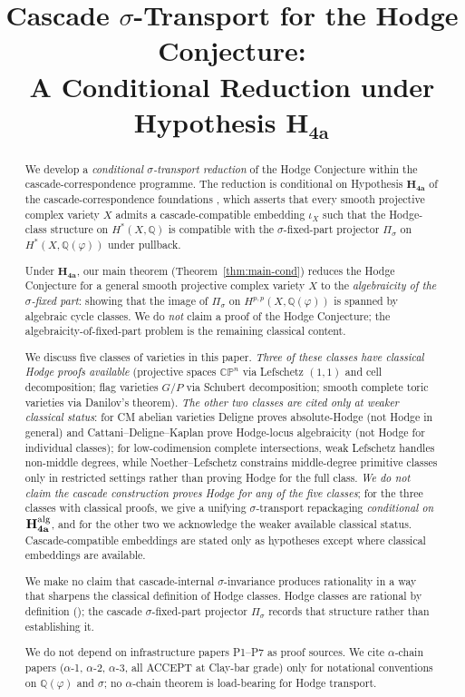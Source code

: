 \documentclass[11pt, a4paper]{amsart}
\title{Cascade $\sigma$-Transport for the Hodge Conjecture:\\
  A Conditional Reduction under Hypothesis $\mathbf{H_{4a}}$}
\author{}
\date{}
\theoremstyle{definition}
\newcommand{\Q}{\mathbb{Q}}
\newcommand{\CP}{\mathbb{CP}}
\begin{document}
\maketitle

\begin{abstract}
We develop a \emph{conditional $\sigma$-transport reduction} of the
Hodge Conjecture within the cascade-correspondence programme. The
reduction is conditional on Hypothesis $\mathbf{H_{4a}}$ of the
cascade-correspondence foundations
\cite[\S H${}_{4a}$]{CascadeFoundations}, which asserts that every
smooth projective complex variety $X$ admits a cascade-compatible
embedding $\iota_X$ such that the Hodge-class structure on
$H^*(X, \Q)$ is compatible with the $\sigma$-fixed-part projector
$\Pi_\sigma$ on $H^*(X, \Q(\varphi))$ under pullback.

Under $\mathbf{H_{4a}}$, our main theorem
(Theorem~\ref{thm:main-cond}) reduces the Hodge Conjecture for a
general smooth projective complex variety $X$ to the
\emph{algebraicity of the $\sigma$-fixed part}: showing that the
image of $\Pi_\sigma$ on $H^{p,p}(X, \Q(\varphi))$ is spanned by
algebraic cycle classes. We do \emph{not} claim a proof of the
Hodge Conjecture; the algebraicity-of-fixed-part problem is the
remaining classical content.

We discuss five classes of varieties in this paper. \emph{Three
of these classes have classical Hodge proofs available}
(projective spaces $\CP^n$ via Lefschetz $(1,1)$ and cell
decomposition; flag varieties $G/P$ via Schubert decomposition;
smooth complete toric varieties via Danilov's theorem). \emph{The
other two classes are cited only at weaker classical status}: for
CM abelian varieties Deligne proves absolute-Hodge (not Hodge in
general) and Cattani--Deligne--Kaplan prove Hodge-locus
algebraicity (not Hodge for individual classes); for low-codimension
complete intersections, weak Lefschetz handles non-middle degrees,
while Noether--Lefschetz constrains middle-degree primitive classes
only in restricted settings rather than proving Hodge for the full
class. \emph{We do not claim the cascade construction proves Hodge
for any of the five classes}; for the three classes with classical
proofs, we give a unifying $\sigma$-transport repackaging
\emph{conditional on $\mathbf{H_{4a}^{\rm alg}}$}, and for the
other two we acknowledge the weaker available classical status.
Cascade-compatible embeddings are stated only as hypotheses except
where classical embeddings are available.

We make no claim that cascade-internal $\sigma$-invariance produces
rationality in a way that sharpens the classical definition of
Hodge classes. Hodge classes are rational by definition
(\cite[Ch.~11]{Voisin2002}); the cascade $\sigma$-fixed-part
projector $\Pi_\sigma$ records that structure rather than
establishing it.

We do not depend on infrastructure papers P1--P7 as proof sources.
We cite $\alpha$-chain papers ($\alpha$-1, $\alpha$-2, $\alpha$-3,
all ACCEPT at Clay-bar grade) only for notational conventions on
$\Q(\varphi)$ and $\sigma$; no $\alpha$-chain theorem is
load-bearing for Hodge transport.
\end{abstract}
\end{document}
